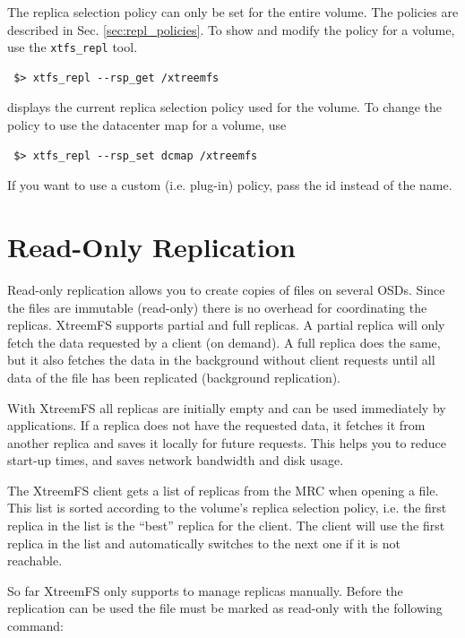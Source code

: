 \documentclass[a4paper,10pt]{book}
\begin{document}
The replica selection policy can only be set for the entire volume. The policies are described in Sec. \ref{sec:repl_policies}. To show and modify the policy for a volume, use the \texttt{xtfs\_repl} tool.

\begin{verbatim}
 $> xtfs_repl --rsp_get /xtreemfs
\end{verbatim}

displays the current replica selection policy used for the volume. To change the policy to use the datacenter map for  a volume, use

\begin{verbatim}
 $> xtfs_repl --rsp_set dcmap /xtreemfs
\end{verbatim}

If you want to use a custom (i.e. plug-in) policy, pass the id instead of the name.

\section{Read-Only Replication}
Read-only replication allows you to create copies of files on several OSDs. Since the files are immutable (read-only) there is no overhead for coordinating the replicas. XtreemFS supports partial and full replicas.
A partial replica will only fetch the data requested by a client (on demand). A full replica does the same, but it also fetches the data in the background without client requests until all data of the file has been replicated (background replication).

With XtreemFS all replicas are initially empty and can be used immediately by applications. If a replica does not have the requested data, it fetches it from another replica and saves it locally for future requests. This helps you to reduce start-up times, and saves network bandwidth and disk usage.

The XtreemFS client gets a list of replicas from the MRC when opening a file. This list is sorted according to the volume's replica selection policy, i.e. the first replica in the list is the ``best'' replica for the client. The client will use the first replica in the list and automatically switches to the next one if it is not reachable.

So far XtreemFS only supports to manage replicas manually. Before the replication can be used the file must be marked as read-only with the following command:
\end{document}
